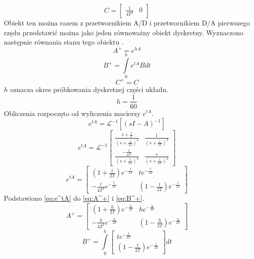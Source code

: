 \begin{equation}
C=
	\begin{bmatrix}
	\frac{1}{4T^2} & 0
	\end{bmatrix}
\end{equation}
Obiekt ten można razem z przetwornikiem A/D i przetwornikiem D/A pierwszego rzędu przedstawić można jako jeden równoważny obiekt dyskretny. Wyznaczono następnie równania stanu tego obiektu \cite{TS}.
\begin{equation}
\label{eq:A^+}
A^+=e^{hA}
\end{equation}
\begin{equation}
\label{eq:B^+}
B^+=\int\limits_{0}^{h}e^{tA}Bdt
\end{equation}
\begin{equation}
C^+=C
\end{equation}
\(h\) oznacza okres próbkowania dyskretnej części układu.
\begin{equation}
h=\frac{1}{60}
\end{equation}
Obliczenia rozpoczęto od wyliczenia macierzy \(e^{tA}\).
\begin{equation}
e^{tA}=\mathcal{L}^{-1}[(sI-A)^{-1}]
\end{equation}
\begin{equation}
e^{tA}=\mathcal{L}^{-1}
	\begin{bmatrix}
	\frac{s+\frac{1}{T}}{(s+\frac{1}{2T})^2} & \frac{1}{(s+\frac{1}{2T})^2} \\
	\frac{-\frac{1}{4T^2}}{(s+\frac{1}{2T})^2} &  \frac{s}{(s+\frac{1}{2T})^2}
	\end{bmatrix}
\end{equation}
\begin{equation}
\label{eq:e^tA}
e^{tA}=
	\begin{bmatrix}
	(1+\frac{t}{2T})e^{-\frac{t}{2T}} & te^{-\frac{t}{2T}} \\
	-\frac{t}{4T^2}e^{-\frac{t}{2T}} & (1-\frac{t}{2T})e^{-\frac{t}{2T}}
	\end{bmatrix}
\end{equation}
Podstawiono \ref{eq:e^tA} do \ref{eq:A^+} i \ref{eq:B^+}.
\begin{equation}
A^+=
	\begin{bmatrix}
	(1+\frac{h}{2T})e^{-\frac{h}{2T}} & he^{-\frac{h}{2T}} \\
	-\frac{h}{4T^2}e^{-\frac{h}{2T}} & (1-\frac{h}{2T})e^{-\frac{h}{2T}}
	\end{bmatrix}
\end{equation}
\begin{equation}
B^+=\int\limits_{0}^{h}
	\begin{bmatrix}
	te^{-\frac{t}{2T}} \\
	(1-\frac{t}{2T})e^{-\frac{t}{2T}}
	\end{bmatrix}
	dt
\end{equation}
